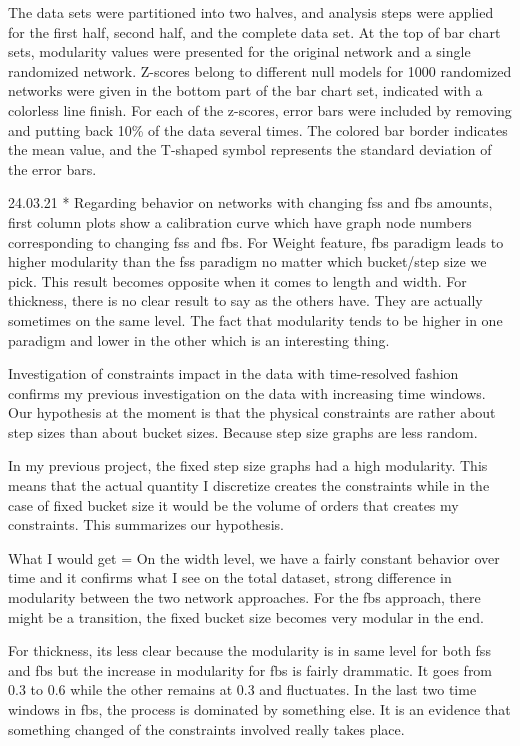 The data sets were partitioned into two halves, and analysis steps were applied for the first half, second half, and the complete data set. At the top of bar chart sets, modularity values were presented for the original network and a single randomized network. Z-scores belong to different null models for 1000 randomized networks were given in the bottom part of the bar chart set, indicated with a colorless line finish. For each of the z-scores, error bars were included by removing and putting back 10\% of the data several times. The colored bar border indicates the mean value, and the T-shaped symbol represents the standard deviation of the error bars.

{\color{red}
	24.03.21
	* Regarding behavior on networks with changing fss and fbs amounts, first column plots show a calibration curve which have graph node numbers corresponding to changing fss and fbs. For Weight feature, fbs paradigm leads to higher modularity than the fss paradigm no matter which bucket/step size we pick. This result becomes opposite when it comes to length and width. For thickness, there is no clear result to say as the others have. They are actually sometimes on the same level. The fact that modularity tends to be higher in one paradigm and lower in the other which is an interesting thing.
	
	Investigation of constraints impact in the data with time-resolved fashion confirms my previous investigation on the data with increasing time windows. 
	Our hypothesis at the moment is that the physical constraints are rather about step sizes than about bucket sizes. Because step size graphs are less random.
	
	In my previous project, the fixed step size graphs had a high modularity. This means that the actual quantity I discretize creates the constraints while in the case of fixed bucket size it would be the volume of orders that creates my constraints. This summarizes our hypothesis. 
	
	What I would get = On the width level, we have a fairly constant behavior over time and it confirms what I see on the total dataset, strong difference in modularity between the two network approaches. For the fbs approach, there might be a transition, the fixed bucket size becomes very modular in the end.
	
	For thickness, its less clear because the modularity is in same level for both fss and fbs but the increase in modularity for fbs is fairly drammatic. It goes from 0.3 to 0.6 while the other remains at 0.3 and fluctuates. In the last two time windows in fbs, the process is dominated by something else. It is an evidence that something changed of the constraints involved really takes place.
	
}
